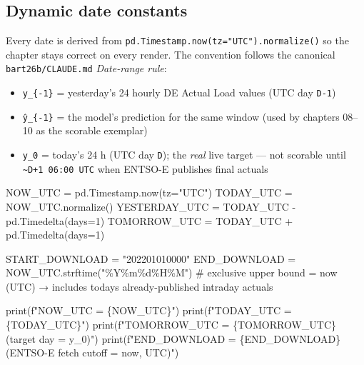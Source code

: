 \documentclass[
  english,
  letterpaper,
]{scrbook}
\newenvironment{Shaded}{\begin{snugshade}}{\end{snugshade}}
\newcommand{\BuiltInTok}[1]{\textcolor[rgb]{0.00,0.23,0.31}{#1}}
\newcommand{\CommentTok}[1]{\textcolor[rgb]{0.37,0.37,0.37}{#1}}
\newcommand{\DecValTok}[1]{\textcolor[rgb]{0.68,0.00,0.00}{#1}}
\newcommand{\NormalTok}[1]{\textcolor[rgb]{0.00,0.23,0.31}{#1}}
\newcommand{\OperatorTok}[1]{\textcolor[rgb]{0.37,0.37,0.37}{#1}}
\newcommand{\SpecialCharTok}[1]{\textcolor[rgb]{0.37,0.37,0.37}{#1}}
\newcommand{\SpecialStringTok}[1]{\textcolor[rgb]{0.13,0.47,0.30}{#1}}
\newcommand{\StringTok}[1]{\textcolor[rgb]{0.13,0.47,0.30}{#1}}
\providecommand{\tightlist}{%
  \setlength{\itemsep}{0pt}\setlength{\parskip}{0pt}}
\begin{document}
\subsection{Dynamic date constants}\label{dynamic-date-constants}

Every date is derived from
\texttt{pd.Timestamp.now(tz="UTC").normalize()} so the chapter stays
correct on every render. The convention follows the canonical
\texttt{bart26b/CLAUDE.md} \emph{Date-range rule}:

\begin{itemize}
\tightlist
\item
  \texttt{y\_\{-1\}} = yesterday's 24 hourly DE Actual Load values (UTC
  day \texttt{D-1})
\item
  \texttt{ŷ\_\{-1\}} = the model's prediction for the same window (used
  by chapters 08--10 as the scorable exemplar)
\item
  \texttt{y\_0} = today's 24 h (UTC day \texttt{D}); the \emph{real}
  live target --- not scorable until
  \texttt{\textasciitilde{}D+1\ 06:00\ UTC} when ENTSO-E publishes final
  actuals
\end{itemize}

\protect{}\label{live-constants}
\begin{Shaded}
\begin{Highlighting}[]
\NormalTok{NOW\_UTC }\OperatorTok{=}\NormalTok{ pd.Timestamp.now(tz}\OperatorTok{=}\StringTok{"UTC"}\NormalTok{)}
\NormalTok{TODAY\_UTC }\OperatorTok{=}\NormalTok{ NOW\_UTC.normalize()}
\NormalTok{YESTERDAY\_UTC }\OperatorTok{=}\NormalTok{ TODAY\_UTC }\OperatorTok{{-}}\NormalTok{ pd.Timedelta(days}\OperatorTok{=}\DecValTok{1}\NormalTok{)}
\NormalTok{TOMORROW\_UTC }\OperatorTok{=}\NormalTok{ TODAY\_UTC }\OperatorTok{+}\NormalTok{ pd.Timedelta(days}\OperatorTok{=}\DecValTok{1}\NormalTok{)}

\NormalTok{START\_DOWNLOAD }\OperatorTok{=} \StringTok{"202201010000"}
\NormalTok{END\_DOWNLOAD }\OperatorTok{=}\NormalTok{ NOW\_UTC.strftime(}\StringTok{"\%Y\%m}\SpecialCharTok{\%d}\StringTok{\%H\%M"}\NormalTok{)   }\CommentTok{\# exclusive upper bound = now (UTC) → includes today\textquotesingle{}s already{-}published intraday actuals}

\BuiltInTok{print}\NormalTok{(}\SpecialStringTok{f"NOW\_UTC       = }\SpecialCharTok{\{}\NormalTok{NOW\_UTC}\SpecialCharTok{\}}\SpecialStringTok{"}\NormalTok{)}
\BuiltInTok{print}\NormalTok{(}\SpecialStringTok{f"TODAY\_UTC     = }\SpecialCharTok{\{}\NormalTok{TODAY\_UTC}\SpecialCharTok{\}}\SpecialStringTok{"}\NormalTok{)}
\BuiltInTok{print}\NormalTok{(}\SpecialStringTok{f"TOMORROW\_UTC  = }\SpecialCharTok{\{}\NormalTok{TOMORROW\_UTC}\SpecialCharTok{\}}\SpecialStringTok{  (target day = y\_0)"}\NormalTok{)}
\BuiltInTok{print}\NormalTok{(}\SpecialStringTok{f"END\_DOWNLOAD  = }\SpecialCharTok{\{}\NormalTok{END\_DOWNLOAD}\SpecialCharTok{\}}\SpecialStringTok{  (ENTSO{-}E fetch cutoff = now, UTC)"}\NormalTok{)}
\end{Highlighting}
\end{Shaded}
\end{document}
